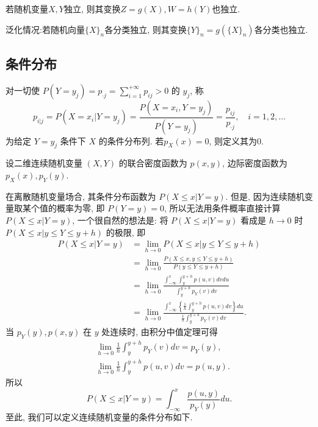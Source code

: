 \begin{theorem}
    若随机变量$X,Y$独立, 则其变换$Z=g(X), W=h(Y)$也独立.

    泛化情况:若随机向量$\{X\}_n$各分类独立, 则其变换$\{Y\}_n=g(\{X\}_n)$各分类也独立.
\end{theorem}

\subsection{条件分布}

\begin{definition}
	对一切使 $P\left(Y=y_{j}\right)=p_{ \cdot j}=\sum_{i=1}^{+\infty} p_{i j}>0$ 的 $y_j$, 称
	\begin{equation}\label{eq:3.5.1}
		p_{i | j}=P\left(X=x_{i} | Y=y_{j}\right)=\frac{P\left(X=x_{i}, Y=y_{j}\right)}{P\left(Y=y_{j}\right)}
		=\frac{p_{i j}}{p_{\cdot j}}, \quad i=1,2, \ldots
	\end{equation}
	为给定 $Y=y_j$ 条件下 $X$ 的条件分布列. 若$p_X(x)=0$, 则定义其为0.
\end{definition}

设二维连续随机变量 $(X,Y)$ 的联合密度函数为 $p(x,y)$, 边际密度函数为 $p_X(x),p_Y(y)$.

在离散随机变量场合, 其条件分布函数为 $P(X\leq x|Y=y)$. 但是, 因为连续随机变量取某个值的概率为零, 即 $P(Y=y)=0$, 所以无法用条件概率直接计算 $P(X\leq x|Y=y)$, 一个很自然的想法是: 将 $P(X\leq x|Y=y)$ 看成是 $h\to 0$ 时 $P(X\leq x|y\leq Y\leq y+h)$ 的极限, 即
\begin{align*}
	P(X \leq  x | Y=y) & =\lim _{h \to 0} P(X \leq  x | y \leq  Y \leq  y+h)                                                          \\
	                   & =\lim _{h \to 0} \frac{P(X \leq  x, y \leq  Y \leq  y+h)}{P(y \leq  Y \leq  y+h)}                            \\
	                   & =\lim _{h \to 0} \frac{\int_{-\infty}^{x} \int_{y}^{y+h} p(u, v) dv du}{\int_{y}^{y+h} p_{Y}(v) dv} \\
	                   & =\lim _{h \to 0} \frac{\int_{-\infty}^{x} \left\{ \frac{1}{h} \int_{y}^{y+h} p(u, v) dv \right\} du}
	{\frac{1}{h} \int_{y}^{y+h} p_{Y}(v) dv}.
\end{align*}
当 $p_Y(y),p(x,y)$ 在 $y$ 处连续时, 由积分中值定理可得
\begin{align*}
	 & \lim _{h \to 0} \frac{1}{h} \int_{y}^{y+h} p_{Y}(v) dv=p_{Y}(y), \\
	 & \lim _{h \to 0} \frac{1}{h} \int_{y}^{y+h} p(u, v) dv=p(u, y).
\end{align*}
所以
\[
	P(X \leq x | Y=y)=\int_{-\infty}^{x} \frac{p(u, y)}{p_{Y}(y)} du.
\]
至此, 我们可以定义连续随机变量的条件分布如下.

